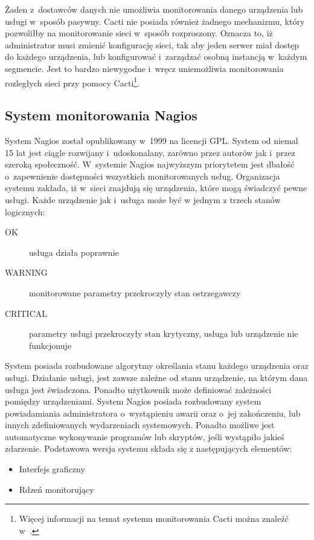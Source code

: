 Żaden z~dostawców danych nie umożliwia monitorowania danego urządzenia
lub usługi w~sposób pasywny. Cacti nie posiada również żadnego
mechanizmu, który pozwoliłby na monitorowanie sieci w~sposób
rozproszony. Oznacza to, iż administrator musi zmienić konfigurację
sieci, tak aby jeden serwer miał dostęp do każdego urządzenia, lub
konfigurować i~zarządzać osobną instancją w~każdym segmencie. Jest to
bardzo niewygodne i~wręcz uniemożliwia monitorowania rozległych sieci
przy pomocy Cacti\footnote{Więcej informacji na temat systemu
  monitorowania Cacti można znaleźć w~\cite{www:Cacti}.}.

\subsection[Nagios][System monitorowania Nagios]{System monitorowania Nagios}

System Nagios został opublikowany w~1999 na licencji GPL. System od
niemal 15 lat jest ciągle rozwijany i~udoskonalany, zarówno przez
autorów jak i~przez szeroką społeczność. W~systemie Nagios najwyższym
priorytetem jest dbałość o~zapewnienie dostępności wszystkich
monitorowanych usług. Organizacja systemu zakłada, iż w~sieci znajdują
się urządzenia, które mogą świadczyć pewne usługi. Każde urządzenie
jak i~usługa może być w jednym z trzech stanów logicznych:

\begin{description}
\item[OK] usługa działa poprawnie
\item[WARNING] monitorowane parametry przekroczyły stan ostrzegawczy
\item[CRITICAL] parametry usługi przekroczyły stan krytyczny, usługa
  lub urządzenie nie funkcjonuje
\end{description}

System posiada rozbudowane algorytmy określania stanu każdego
urządzenia oraz usługi. Działanie usługi, jest zawsze zależne od stanu
urządzenie, na którym dana usługa jest świadczona. Ponadto użytkownik
może definiować zależności pomiędzy urządzeniami. System Nagios
posiada rozbudowany system powiadamiania administratora o~wystąpieniu
awarii oraz o~jej zakończeniu, lub innych zdefiniowanych wydarzeniach
systemowych. Ponadto możliwe jest automatyczne wykonywanie programów
lub skryptów, jeśli wystąpiło jakieś zdarzenie. Podstawowa wersja
systemu składa się z następujących elementów:

\begin{itemize}
\item Interfejs graficzny
\item Rdzeń monitorujący
\end{itemize}

